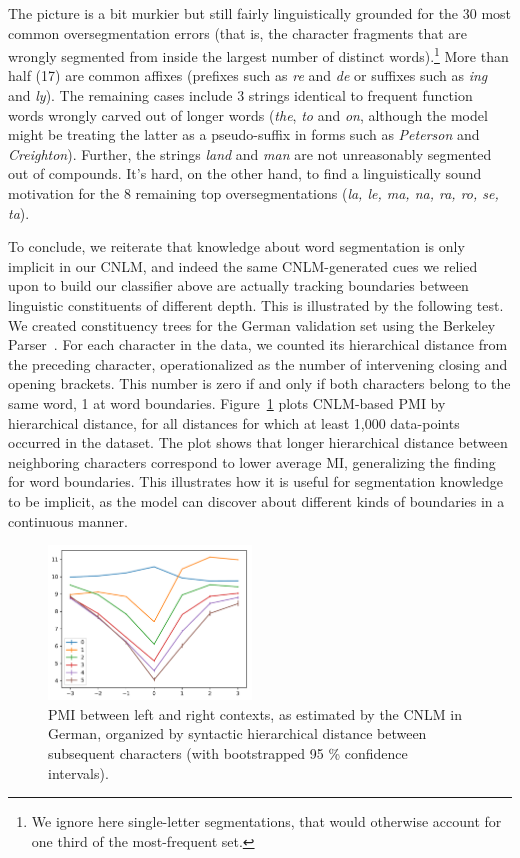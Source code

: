 The picture is a bit murkier but still fairly linguistically grounded
for the 30 most common oversegmentation errors (that is, the character
fragments that are wrongly segmented from inside the largest number of
distinct words).\footnote{We ignore here single-letter segmentations,
  that would otherwise account for one third of the most-frequent
  set.}  More than half (17) are common affixes (prefixes such as
\emph{re} and \emph{de} or suffixes such as \emph{ing} and
\emph{ly}). The remaining cases include 3 strings identical to frequent
function words wrongly carved out of longer words (\emph{the},
\emph{to} and \emph{on}, although the model might be treating the
latter as a pseudo-suffix in forms such as \emph{Peterson} and
\emph{Creighton}). Further, the strings \emph{land} and \emph{man} are not
unreasonably segmented out of compounds. It's hard, on the other hand,
to find a linguistically sound motivation for the 8 remaining top
oversegmentations (\emph{la, le, ma, na, ra, ro, se, ta}).

To conclude, we reiterate that knowledge about word segmentation is
only implicit in our CNLM, and indeed the same CNLM-generated cues we
relied upon to build our classifier above are actually tracking
boundaries between linguistic constituents of different depth. This is
illustrated by the following test. We created constituency trees for
the German validation set using the Berkeley
Parser~\cite{petrov2007improved}.  For each character in the data, we
counted its hierarchical distance from the preceding character,
operationalized as the number of intervening closing and opening
brackets.  This number is zero if and only if both characters belong
to the same word, 1 at word boundaries. Figure~\ref{fig:syntax-depth}
plots CNLM-based PMI by hierarchical distance, for all distances for
which at least 1,000 data-points occurred in the dataset.  The plot
shows that longer hierarchical distance between neighboring characters
correspond to lower average MI, generalizing the finding for word
boundaries.  This illustrates how it is useful for segmentation
knowledge to be implicit, as the model can discover about different
kinds of boundaries in a continuous manner.

\begin{figure}
\includegraphics[width=0.48\textwidth]{figures/segmentation-profile-pmis-german-all-heights-ci.pdf}
\caption{PMI between left and right contexts, as estimated by the CNLM in German, organized by syntactic hierarchical distance between subsequent characters (with bootstrapped 95 \% confidence intervals).}\label{fig:syntax-depth}
\end{figure}





